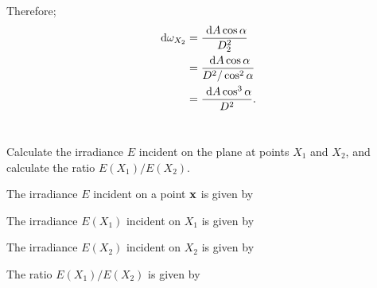 \begin{problem}
\begin{enumroman}
\begin{answer}
\begin{enumarabic}
            Therefore;
            \begin{align*}
              \text{ d} \omega_{X_2} &= \frac{\text{ d} A \cos\alpha}{D_2^2} \\
              &= \frac{\text{ d} A \cos\alpha}{D^2/\cos^2\alpha} \\
              &= \frac{\text{ d} A \cos^3\alpha}{D^2}.
            \end{align*}
            ~\label{item:1.2}
        \end{enumarabic}
      \end{answer}
    \newpage
    \item Calculate the irradiance $E$ incident on the plane at points $X_1$ and $X_2$,
      and calculate the ratio $E(X_1)/E(X_2)$.
      \begin{answer}
        The irradiance $E$ incident on a point $\mathbf{x}$ is given by
        \begin{enumarabic}
          \item The irradiance $E(X_1)$ incident on $X_1$ is given by
            
          \item The irradiance $E(X_2)$ incident on $X_2$ is given by
          \item The ratio $E(X_1)/E(X_2)$ is given by
          \end{enumarabic}
      \end{answer}
  \end{enumroman}
\end{problem}


